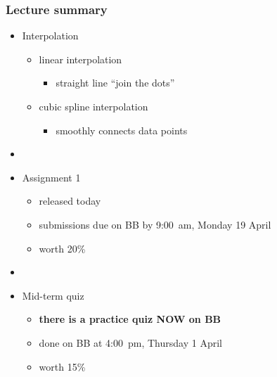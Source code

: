 \documentclass[english,14pt]{beamer}
\newcommand\red[1]{{\color{red} #1}}
\begin{document}
\begin{frame}[fragile]

\frametitle{Lecture summary}
\begin{itemize}
	\item Interpolation
	\begin{itemize}
		\item linear interpolation
		\begin{itemize}
			\item straight line ``join the dots''
		\end{itemize}
		\item cubic spline interpolation
		\begin{itemize}
			\item smoothly connects data points
		\end{itemize}
	\end{itemize}

	\item[]
	
	\item Assignment 1
	\begin{itemize}
		\item released today
		\item submissions due on BB by \red{9:00~am, Monday 19 April}
		\item worth 20\%
	\end{itemize}

	\item[]
	
	\item Mid-term quiz
		\begin{itemize}
			\item \textbf{there is a practice quiz NOW on BB}
			\item done on BB at \red{4:00~pm, Thursday 1 April}
			\item worth 15\%
		\end{itemize}
		
\end{itemize}
\end{frame}
\end{document}
